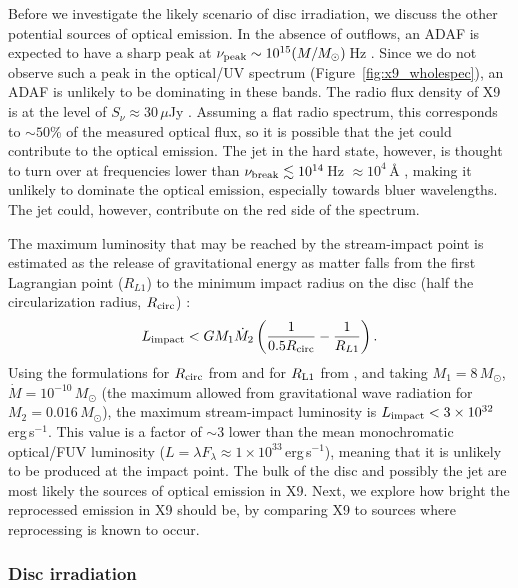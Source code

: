 \documentclass[a4paper,fleqn,usenatbib]{mnras}
\begin{document}
Before we investigate the likely scenario of disc irradiation, we discuss the other potential sources of optical emission. In the absence of outflows, an ADAF is expected to have a sharp peak at $\nu_{\rm peak} \sim 10^{15} (M/M_\odot)$\,Hz \citep{1994ApJ...428L..13N,1999ApJ...520..298Q}. Since we do not observe such a peak in the optical/UV spectrum (Figure~\ref{fig:x9_wholespec}), an ADAF is unlikely to be dominating in these bands. The radio flux density of X9 is at the level of $S_\nu \approx 30$\,$\mu$Jy \citep{2015MNRAS.453.3918M, 2017MNRAS.467.2199B}. Assuming a flat radio spectrum, this corresponds to $\sim 50$\% of the measured optical flux, so it is possible that the jet could contribute to the optical emission. The jet in the hard state, however, is thought to turn over at frequencies lower than $\nu_{\rm break} \lesssim 10^{14}$\,Hz $\approx 10^{4}$\,{\AA} \citep{2013MNRAS.429..815R}, making it unlikely to dominate the optical emission, especially towards bluer wavelengths. The jet could, however, contribute on the red side of the spectrum.

The maximum luminosity that may be reached by the stream-impact point is estimated as the release of gravitational energy as matter falls from the first Lagrangian point ($R_{L1}$) to the minimum impact radius on the disc (half the circularization radius, $R_{\rm circ}$) \citep{2001ApJ...557..304M}:
\begin{equation}
L_{\rm impact} < G M_1 \dot{M}_2 \left( \frac{1}{0.5 R_{\rm circ}} - \frac{1}{R_{L1}} \right).
\end{equation}
Using the formulations for $R_{\rm circ}$ from \citet[their Equation 13]{1988ApJ...332..193V} and for $R_{\rm L1}$ from \citet[their Equation C.3]{2012A&A...537A.104V}, and taking $M_1 = 8\,M_\odot$, $\dot{M} = 10^{-10}\,M_\odot$ (the maximum allowed from gravitational wave radiation for $M_2 = 0.016\,M_\odot$), the maximum stream-impact luminosity is $L_{\rm impact} < 3 \times 10^{32}$\,erg\,s$^{-1}$. This value is a factor of $\sim$3 lower than the mean monochromatic optical/FUV luminosity ($L = \lambda F_{\lambda} \approx 1 \times 10^{33}$\,erg\,s$^{-1}$), meaning that it is unlikely to be produced at the impact point. The bulk of the disc and possibly the jet are most likely the sources of optical emission in X9. Next, we explore how bright the reprocessed emission in X9 should be, by comparing X9 to sources where reprocessing is known to occur.

\subsubsection{Disc irradiation}
\end{document}
